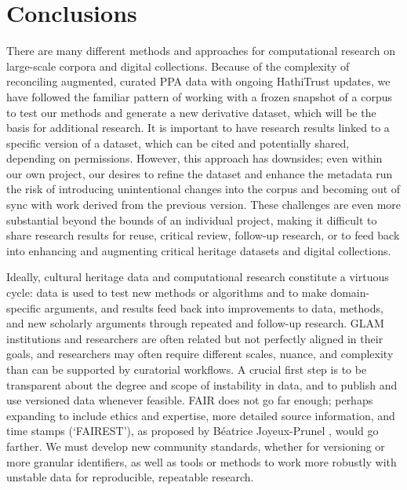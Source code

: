 \documentclass[final]{anthology-ch} %
\begin{document}
\section{Conclusions}

There are many different methods and approaches for computational research on large-scale corpora and digital collections. Because of the complexity of reconciling augmented, curated PPA data with ongoing HathiTrust updates, we have followed the familiar pattern of working with a frozen snapshot of a corpus to test our methods and generate a new derivative dataset, which will be the basis for additional research. It is important to have research results linked to a specific version of a dataset, which can be cited and potentially shared, depending on permissions. However, this approach has downsides; even within our own project, our desires to refine the dataset and enhance the metadata run the risk of introducing unintentional changes into the corpus and becoming out of sync with work derived from the previous version. These challenges are even more substantial beyond the bounds of an individual project, making it difficult to share research results for reuse, critical review, follow-up research, or to feed back into enhancing and augmenting critical heritage datasets and digital collections. 

Ideally, cultural heritage data and computational research constitute a virtuous cycle: data is used to test new methods or algorithms and to make domain-specific arguments, and results feed back into improvements to data, methods, and new scholarly arguments through repeated and follow-up research. GLAM institutions and researchers are often related but not perfectly aligned in their goals, and researchers may often require different scales, nuance, and complexity than can be supported by curatorial workflows. A crucial first step is to be transparent about the degree and scope of instability in data, and to publish and use versioned data whenever feasible. FAIR does not go far enough; perhaps expanding to include ethics and expertise, more detailed source information, and time stamps (`FAIREST'), as proposed by Béatrice Joyeux-Prunel \cite{joyeux-prunel_digital_2024}, would go farther. We must develop new community standards, whether for versioning or more granular identifiers, as well as tools or methods to work more robustly with unstable data for reproducible, repeatable research.  

\end{document}
